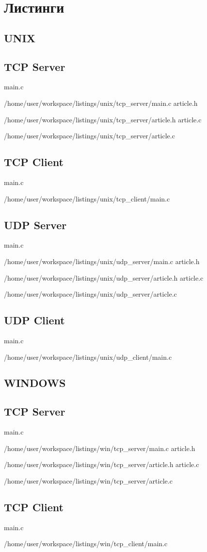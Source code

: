 \documentclass[12pt,a4paper]{report}
\begin{document}
\section*{Листинги}
\subsection*{UNIX}
\subsection*{TCP Server}
main.c

{/home/user/workspace/listings/unix/tcp_server/main.c}
article.h

{/home/user/workspace/listings/unix/tcp_server/article.h}
article.c

{/home/user/workspace/listings/unix/tcp_server/article.c}
\subsection*{TCP Client}
main.c

{/home/user/workspace/listings/unix/tcp_client/main.c}
\subsection*{UDP Server}
main.c

{/home/user/workspace/listings/unix/udp_server/main.c}
article.h

{/home/user/workspace/listings/unix/udp_server/article.h}
article.c

{/home/user/workspace/listings/unix/udp_server/article.c}
\subsection*{UDP Client}
main.c

{/home/user/workspace/listings/unix/udp_client/main.c}
\subsection*{WINDOWS}
\subsection*{TCP Server}
main.c

{/home/user/workspace/listings/win/tcp_server/main.c}
article.h

{/home/user/workspace/listings/win/tcp_server/article.h}
article.c

{/home/user/workspace/listings/win/tcp_server/article.c}
\subsection*{TCP Client}
main.c

{/home/user/workspace/listings/win/tcp_client/main.c}
\end{document}
